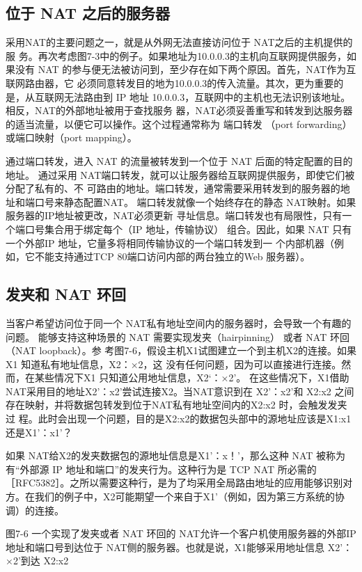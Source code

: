 \subsection{位于 NAT 之后的服务器}

采用NAT的主要问题之一，就是从外网无法直接访问位于 NAT之后的主机提供的服
务。再次考虑图7-3中的例子。如果地址为10.0.0.3的主机向互联网提供服务，如果没有
NAT 的参与便无法被访问到，至少存在如下两个原因。首先，NAT作为互联网路由器，它
必须同意转发目的地为10.0.0.3的传入流量。其次，更为重要的是，从互联网无法路由到 IP
地址 10.0.0.3，互联网中的主机也无法识别该地址。相反，NAT的外部地址被用于查找服务
器，NAT必须妥善重写和转发到达服务器的适当流量，以便它可以操作。这个过程通常称为
端口转发 （port forwarding） 或端口映射（port mapping）。

通过端口转发，进入 NAT 的流量被转发到一个位于 NAT 后面的特定配置的目的地址。
通过采用 NAT端口转发，就可以让服务器给互联网提供服务，即使它们被分配了私有的、不
可路由的地址。端口转发，通常需要采用转发到的服务器的地址和端口号来静态配置NAT。
端口转发就像一个始终存在的静态 NAT映射。如果服务器的IP地址被更改，NAT必须更新
寻址信息。端口转发也有局限性，只有一个端口号集合用于绑定每个（IP 地址，传输协议）
组合。因此，如果 NAT 只有一个外部IP 地址，它量多将相同传输协议的一个端口转发到一
个内部机器（例如，它不能支持通过TCP 80端口访问内部的两台独立的Web 服务器）。

\subsection{发夹和 NAT 环回}

当客户希望访问位于同一个 NAT私有地址空间内的服务器时，会导致一个有趣的问题。
能够支持这种场景的 NAT 需要实现发夹（hairpinning） 或者 NAT 环回（NAT loopback）。参
考图7-6，假设主机X1试图建立一个到主机X2的连接。如果X1 知道私有地址信息，X2：×2，这
没有任何问题，因为可以直接进行连接。然而，在某些情况下X1 只知道公用地址信息，X2‘：×2’。
在这些情况下，X1借助NAT采用目的地址X2'：x2'尝试连接X2。当NAT意识到在 X2'：x2'和
X2:x2 之间存在映射，并将数据包转发到位于NAT私有地址空间内的X2:x2 时，会触发发夹过
程。此时会出现一个问题，目的是X2:x2的数据包头部中的源地址应该是X1:x1 还是X1'：x1'？

如果 NAT给X2的发夹数据包的源地址信息是X1'：x！'，那么这种 NAT 被称为有“外部源 IP
地址和端口”的发夹行为。这种行为是 TCP NAT
所必需的［RFC5382］。之所以需要这种行，是为了均采用全局路由地址的应用能够识别对
方。在我们的例子中，X2可能期望一个来自于X1'（例如，因为第三方系统的协调）的连接。

图7-6 一个实现了发夹或者 NAT 环回的 NAT允许一个客户机使用服务器的外部IP
地址和端口号到达位于 NAT侧的服务器。也就是说，X1能够采用地址信息
X2'：×2'到达 X2:x2

